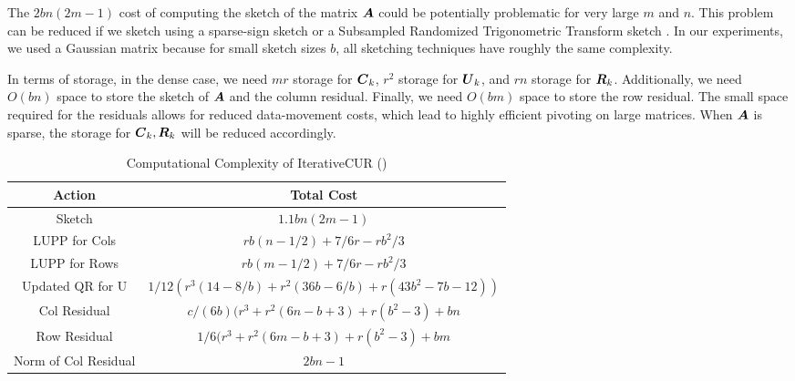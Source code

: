 The $2bn(2m-1)$ cost of computing the sketch of the matrix $\boldsymbol{A}$ could be potentially problematic for very large $m$ and $n$. This problem can be reduced if we sketch using a sparse-sign sketch \cite{cohen2016nearly} or a Subsampled Randomized Trigonometric Transform sketch \cite{tropp2019streaming}. In our experiments, we used a Gaussian matrix because for small sketch sizes $b$, all sketching techniques have roughly the same complexity. 

In terms of storage, in the dense case, we need $mr$
storage for $\boldsymbol{C}_k$,  $r^2$ storage for $\boldsymbol{U}_k$, and $rn$ storage for $\boldsymbol{R}_k$. Additionally, we need $O(bn)$ space to store the sketch of $\boldsymbol{A}$ and the column residual. Finally, we need $O(bm)$ space to store the row residual. The small space required for the residuals allows for reduced data-movement costs, which lead to highly efficient pivoting on large matrices. When $\boldsymbol{A}$ is sparse, the storage for $\boldsymbol{C}_k,\boldsymbol{R}_k$ will be reduced accordingly. 


	\begin{center}
		\begin{table}
            \label{tab:comp-complex}
\caption{Computational Complexity of IterativeCUR (\icur)}                     
		    \begin{tabular}{|c|c|}
                \hline
		        Action &  Total Cost\\
		        \hline
                Sketch & $1.1bn(2m-1)$\\
                LUPP for Cols & $rb (n - 1/2) + 7/6 r - rb^2 / 3$\\
                LUPP for Rows & $rb (m - 1/2) + 7/6 r - rb^2 / 3$\\
                Updated QR for U & $1/12 (r^3 (14 - 8/b) + r^2 (36b - 6/b) + r(43b^2 - 7b  -12))$\\
		        Col Residual & $c/(6b) (r^3 + r^2(6n - b + 3) + r(b^2 - 3) + bn$ \\
		        Row Residual & $1/6 (r^3 + r^2 (6m - b + 3) + r(b^2 - 3) + bm$ \\
		       {Norm of Col Residual} & {$2bn - 1$}\\
                \hline
                
	        \end{tabular}            
	    \end{table}
        
	\end{center}

